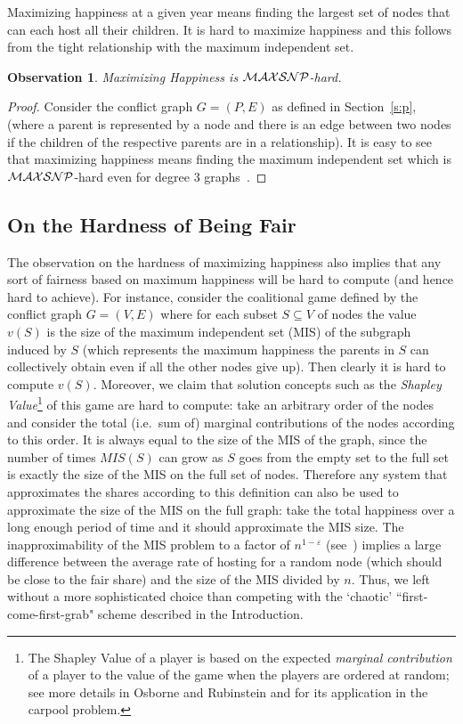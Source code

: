 \documentclass[11pt]{article}
\newtheorem{observation}[theorem]{Observation}
\begin{document}
Maximizing happiness at a given year means finding the largest set of nodes that can each host all their children.
It is hard to maximize happiness and this follows from the tight relationship with the maximum independent set.

\begin{observation}\label{t:ind}
Maximizing Happiness is $\cal{MAXSNP}$-hard.
\end{observation}

\begin{proof} Consider the conflict graph $G=(P,E)$ as defined in Section~\ref{s:p},
(where a parent is represented by a node and there is an edge between two nodes if the children of the respective parents are
in a relationship).
It is easy to see that maximizing happiness means finding the maximum
independent set which is $\cal{MAXSNP}$-hard
even for degree 3 graphs~\cite{bf:95}.
\end{proof}

\subsection{On the Hardness of Being Fair}
\label{sec:hard_fair}
The observation on the hardness of maximizing happiness also implies that any sort of fairness based on maximum happiness will be hard to compute (and hence hard to achieve).
For instance, consider the coalitional game defined by the conflict graph $G=(V,E)$ where for each subset $S \subseteq V$ of nodes the value $v(S)$ is the size of the maximum independent set (MIS) of the subgraph induced by $S$ (which represents the maximum happiness the parents in $S$ can collectively obtain even if all the other nodes give up). Then clearly it is hard to compute $v(S)$. Moreover,  we claim that solution concepts such as the {\em Shapley Value}\footnote{The Shapley Value of a player is based on the expected {\em marginal contribution} of a player to the value of the game when the players are ordered at random; see more details in Osborne and Rubinstein \cite{OsborneR94} and \cite{Naor2005} for its application in the carpool problem.} of this game are hard to compute: take an arbitrary order of the nodes and consider the total (i.e.\ sum of) marginal contributions of the nodes according to this order. It is always equal to the size of the MIS of the graph, since the number of times $MIS(S)$ can grow as $S$ goes from the empty set to the full set is exactly the size of the MIS on the full set of nodes. Therefore any system that approximates the shares according to this definition can also be used to approximate the size of the MIS on the full graph: take the total happiness over a long enough period of time and it should approximate the MIS size. The inapproximability of the MIS problem to a factor of $n^{1-\varepsilon}$ (see~\cite{Hastad99}) implies a large difference between the average rate of hosting for a  random node (which should be close to the fair share) and the size of the MIS divided by $n$.  Thus, we left without a more sophisticated choice than competing with the `chaotic' ``first-come-first-grab" scheme described in the Introduction.
\end{document}
